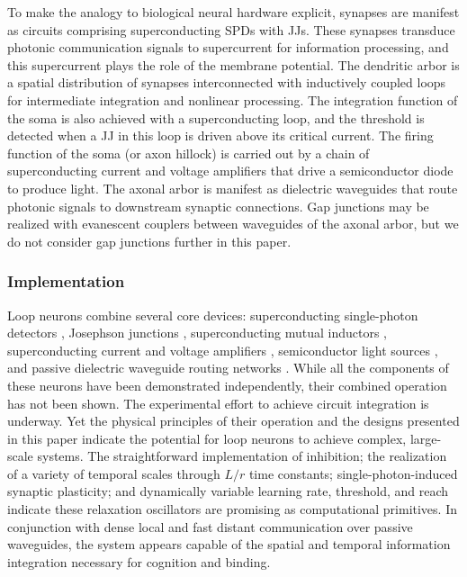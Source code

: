 \documentclass[twocolumn]{article}
\begin{document}
To make the analogy to biological neural hardware explicit, synapses are manifest as circuits comprising superconducting SPDs with JJs. These synapses transduce photonic communication signals to supercurrent for information processing, and this supercurrent plays the role of the membrane potential. The dendritic arbor is a spatial distribution of synapses interconnected with inductively coupled loops for intermediate integration and nonlinear processing. The integration function of the soma is also achieved with a superconducting loop, and the threshold is detected when a JJ in this loop is driven above its critical current. The firing function of the soma (or axon hillock) is carried out by a chain of superconducting current and voltage amplifiers that drive a semiconductor diode to produce light. The axonal arbor is manifest as dielectric waveguides that route photonic signals to downstream synaptic connections. Gap junctions may be realized with evanescent couplers between waveguides of the axonal arbor, but we do not consider gap junctions further in this paper.

\subsubsection{\label{sec:implementation}Implementation}
Loop neurons combine several core devices: superconducting single-photon detectors \cite{gook2001,nata2012,liyo2013,mave2013}, Josephson junctions \cite{ti1996,vatu1998,ka1999}, superconducting mutual inductors \cite{miha2005}, superconducting current \cite{mcbe2014,mcab2016} and voltage amplifiers \cite{zhto2018}, semiconductor light sources \cite{shbu2017,buch2017}, and passive dielectric waveguide routing networks \cite{chbu2017,sami2017,chbu2018}. While all the components of these neurons have been demonstrated independently, their combined operation has not been shown. The experimental effort to achieve circuit integration is underway. Yet the physical principles of their operation and the designs presented in this paper indicate the potential for loop neurons to achieve complex, large-scale systems. The straightforward implementation of inhibition; the realization of a variety of temporal scales through $L/r$ time constants; single-photon-induced synaptic plasticity; and dynamically variable learning rate, threshold, and reach indicate these relaxation oscillators are promising as computational primitives. In conjunction with dense local and fast distant communication over passive waveguides, the system appears capable of the spatial and temporal information integration necessary for cognition and binding. 
	
\end{document}
